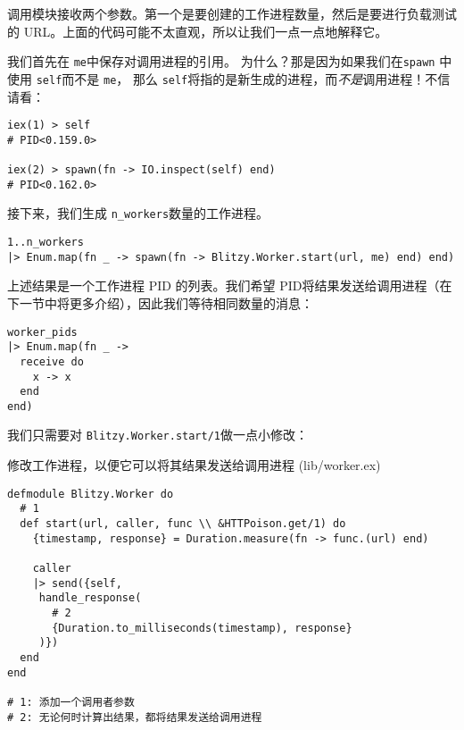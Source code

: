 调用模块接收两个参数。第一个是要创建的工作进程数量，然后是要进行负载测试的
URL。上面的代码可能不太直观，所以让我们一点一点地解释它。

我们首先在 \texttt{me}中保存对调用进程的引用。
为什么？那是因为如果我们在\texttt{spawn} 中使用 \texttt{self}而不是 \texttt{me}，
那么 \texttt{self}将指的是新生成的进程，而\emph{不是}调用进程！不信请看：

\begin{code}{}\begin{verbatim}
iex(1) > self
# PID<0.159.0>

iex(2) > spawn(fn -> IO.inspect(self) end)
# PID<0.162.0>
\end{verbatim}
\end{code}

接下来，我们生成 \texttt{n\_workers}数量的工作进程。

\begin{code}{}\begin{verbatim}
1..n_workers
|> Enum.map(fn _ -> spawn(fn -> Blitzy.Worker.start(url, me) end) end)
\end{verbatim}
\end{code}

上述结果是一个工作进程 PID 的列表。我们希望 PID将结果发送给调用进程（在下一节中将更多介绍），因此我们等待相同数量的消息：

\begin{code}{}
\begin{verbatim}
worker_pids
|> Enum.map(fn _ ->
  receive do
    x -> x
  end
end)
\end{verbatim}
\end{code}

我们只需要对 \texttt{Blitzy.Worker.start/1}做一点小修改：

\begin{code}{修改工作进程，以便它可以将其结果发送给调用进程 (lib/worker.ex)}

\begin{verbatim}
defmodule Blitzy.Worker do
  # 1
  def start(url, caller, func \\ &HTTPoison.get/1) do
    {timestamp, response} = Duration.measure(fn -> func.(url) end)

    caller
    |> send({self,
     handle_response(
       # 2
       {Duration.to_milliseconds(timestamp), response}
     )})
  end
end

# 1: 添加一个调用者参数
# 2: 无论何时计算出结果，都将结果发送给调用进程
\end{verbatim}
\end{code}

